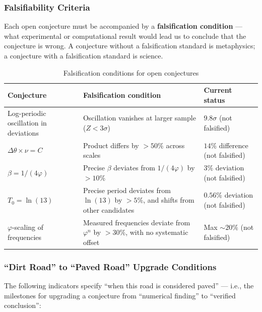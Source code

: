 \documentclass[12pt,a4paper,twocolumn]{article}
\renewcommand{\phi}{\varphi}
\begin{document}
\subsubsection{Falsifiability Criteria}
\label{subsubsec:falsifiability_en}

Each open conjecture must be accompanied by a \textbf{falsification condition} --- what experimental or computational result would lead us to conclude that the conjecture is wrong. A conjecture without a falsification standard is metaphysics; a conjecture with a falsification standard is science.

\begin{table}[htbp]
\centering
\caption{Falsification conditions for open conjectures}
\label{tab:falsifiability_en}
\begin{tabular}{lll}
\hline
Conjecture & Falsification condition & Current status \\
\hline
Log-periodic oscillation in deviations & Oscillation vanishes at larger sample ($Z<3\sigma$) & $9.8\sigma$ (not falsified) \\
$\Delta\theta \times \nu = C$ & Product differs by $>50\%$ across scales & $14\%$ difference (not falsified) \\
$\beta = 1/(4\phi)$ & Precise $\beta$ deviates from $1/(4\phi)$ by $>10\%$ & $3\%$ deviation (not falsified) \\
$T_0 = \ln(13)$ & Precise period deviates from $\ln(13)$ by $>5\%$, and shifts from other candidates & $0.56\%$ deviation (not falsified) \\
$\phi$-scaling of frequencies & Measured frequencies deviate from $\phi^n$ by $>30\%$, with no systematic offset & Max $\sim 20\%$ (not falsified) \\
\hline
\end{tabular}
\end{table}

\subsubsection{``Dirt Road'' to ``Paved Road'' Upgrade Conditions}
\label{subsubsec:upgrade_conditions_en}

The following indicators specify ``when this road is considered paved'' --- i.e., the milestones for upgrading a conjecture from ``numerical finding'' to ``verified conclusion'':
\end{document}

